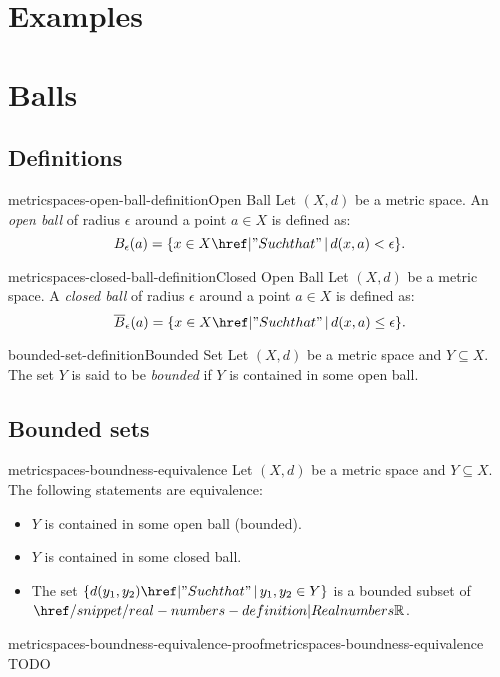\documentclass[preview]{standalone}
\begin{document}
\section{Examples}


\section{Balls}

\subsection{Definitions}

\begin{snippetdefinition}{metricspaces-open-ball-definition}{Open Ball}
    Let \((X, d)\) be a metric space.
    An \textit{open ball} of radius \(\epsilon\) around a point
    \(a \in X\) is defined as:
    \[
        B_\epsilon(a) = \{x \in X \suchthat d(x,a) < \epsilon\}.
    \]
\end{snippetdefinition}

\begin{snippetdefinition}{metricspaces-closed-ball-definition}{Closed Open Ball}
    Let \((X, d)\) be a metric space.
    A \textit{closed ball} of radius \(\epsilon\) around a point
    \(a \in X\) is defined as:
    \[
        \overline{B}_\epsilon(a) = \{x \in X \suchthat d(x,a) \leq \epsilon\}.
    \]
\end{snippetdefinition}

\begin{snippetdefinition}{bounded-set-definition}{Bounded Set}
    Let \((X, d)\) be a metric space and \(Y \subseteq X\).
    The set \(Y\) is said to be \textit{bounded} if \(Y\)
    is contained in some open ball.
\end{snippetdefinition}

\subsection{Bounded sets}

\begin{snippetlemma}{metricspaces-boundness-equivalence}{}
    Let \((X, d)\) be a metric space and \(Y \subseteq X\).
    The following statements are equivalence:
    \begin{itemize}
        \item \(Y\) is contained in some open ball (bounded).
        \item \(Y\) is contained in some closed ball.
        \item The set \(\{d(y_1,y_2) \suchthat y_1, y_2 \in Y\}\)
            is a bounded subset of \(\realnumbers\).
    \end{itemize}
\end{snippetlemma}

\begin{snippetproof}{metricspaces-boundness-equivalence-proof}{metricspaces-boundness-equivalence}{}
    TODO
\end{snippetproof}
\end{document}
